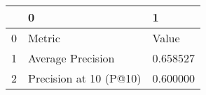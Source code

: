 \begin{tabular}{lll}
\toprule
 & 0 & 1 \\
\midrule
0 & Metric & Value \\
1 & Average Precision & 0.658527 \\
2 & Precision at 10 (P@10) & 0.600000 \\
\bottomrule
\end{tabular}
